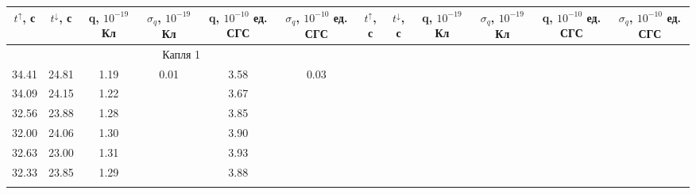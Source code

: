 \documentclass[14pt, a4paper,reqno]{article}
\begin{document}
    \begin{table}[h]
    \begin{tabular}{|c|c|c|c|c|c|c|c|c|c|c|c|}
        \hline
        $t^{\uparrow}$, с & $t^{\downarrow}$, с & \shortstack{q, \\ $10^{-19}$ Кл} & \shortstack{$\sigma_q$, \\ $10^{-19}$ Кл} & \shortstack{q, $10^{-10}$ \\ ед. СГС} & \shortstack{$\sigma_q$, $10^{-10}$ \\ ед. СГС} &
        $t^{\uparrow}$, с & $t^{\downarrow}$, с & \shortstack{q, \\ $10^{-19}$ Кл} & \shortstack{$\sigma_q$, \\ $10^{-19}$ Кл} & \shortstack{q, $10^{-10}$ \\ ед. СГС} & \shortstack{$\sigma_q$, $10^{-10}$ \\ ед. СГС} \\ \hline\hline
        \multicolumn{6}{|c|}{Капля 1}                                                      &         &         &         &                       &       &                      \\ \hline
        34.41   & 24.81   & 1.19    & \multirow{7}{*}{0.01} & 3.58 & \multirow{7}{*}{0.03} &         &         &         &                       &       &                      \\ \hhline{---~-~------}
        34.09   & 24.15   & 1.22    &                       & 3.67 &                       &         &         &         &                       &       &                      \\ \hhline{---~-~------}
        32.56   & 23.88   & 1.28    &                       & 3.85 &                       &         &         &         &                       &       &                      \\ \hhline{---~-~------}
        32.00   & 24.06   & 1.30    &                       & 3.90 &                       &         &         &         &                       &       &                      \\ \hhline{---~-~------}
        32.63   & 23.00   & 1.31    &                       & 3.93 &                       &         &         &         &                       &       &                      \\ \hhline{---~-~------}
        32.33   & 23.85   & 1.29    &                       & 3.88 &                       &         &         &         &                       &       &                      \\ \hhline{---~-~------}

\end{tabular}
\end{table}
\end{document}
